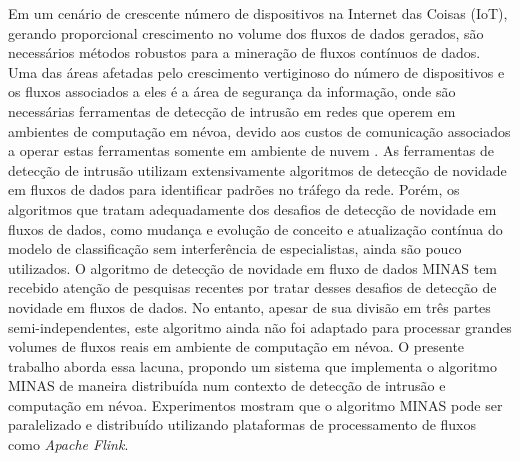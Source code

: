 
\setlength{\absparsep}{18pt} %
\begin{resumo}

    Em um cenário de crescente número de dispositivos na Internet das Coisas
    (IoT), gerando proporcional crescimento no volume dos fluxos de dados
    gerados, são necessários métodos robustos para a mineração de fluxos
    contínuos de dados.
    Uma das áreas afetadas pelo crescimento vertiginoso do número de
    dispositivos e os fluxos associados a eles é a área de segurança da
    informação, onde são necessárias ferramentas de detecção de intrusão em
    redes que operem em ambientes de computação em névoa, devido aos custos de
    comunicação associados a operar estas ferramentas 
        somente em ambiente de nuvem
    .
    As ferramentas de detecção de intrusão utilizam extensivamente algoritmos de
    detecção de novidade em fluxos de dados para identificar padrões no tráfego
    da rede.
    Porém, os algoritmos que tratam adequadamente dos desafios de detecção de
    novidade em fluxos de dados, como mudança e evolução de conceito e
    atualização contínua do modelo de classificação sem interferência de
    especialistas, ainda são pouco utilizados.
    O algoritmo de detecção de novidade em fluxo de dados MINAS tem recebido
    atenção de pesquisas recentes por tratar desses desafios de detecção de novidade
    em fluxos de dados.
    No entanto, apesar de sua divisão em três partes semi-independentes, este
    algoritmo ainda não foi adaptado para processar grandes volumes de fluxos
    reais em ambiente de computação em névoa.
    O presente trabalho aborda essa lacuna, propondo um sistema
    que implementa o algoritmo MINAS de maneira distribuída num contexto
    de detecção de intrusão e computação em névoa.
    Experimentos mostram que o algoritmo MINAS pode ser paralelizado e
    distribuído utilizando plataformas de processamento de fluxos como
    \emph{Apache Flink}.


\end{resumo}

